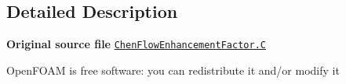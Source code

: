 \subsection{Detailed Description}
{\bfseries Original source file} \href{../../../home/carlo/data/GeN-Foam/GeN-Foam_ffn/GeN-Foam/GeN-Foam/classes/thermalHydraulics/src/physicsModels/heatTransferModels/FSHeatTransferCoefficientModels/subModels/flowEnhancementFactorModels/Chen/ChenFlowEnhancementFactor.C}{\tt Chen\+Flow\+Enhancement\+Factor.\+C}

Open\+F\+O\+AM is free software\+: you can redistribute it and/or modify it 